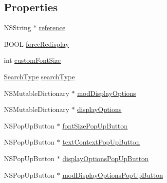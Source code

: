 \subsection*{Properties}
\begin{DoxyCompactItemize}
\item 
N\-S\-String $\ast$ \hyperlink{interface_module_commons_view_controller_a934a327293856e28b3dde0cab70e273c}{reference}
\item 
B\-O\-O\-L \hyperlink{interface_module_commons_view_controller_a0832b42c73bc41b106a06da9c8162868}{force\-Redisplay}
\item 
int \hyperlink{interface_module_commons_view_controller_a44abae3fa6c5495e330b4268a5cc5630}{custom\-Font\-Size}
\item 
\hyperlink{_indexer_8h_a15cc00b2ac3048d3b89959ced9ba0520}{Search\-Type} \hyperlink{interface_module_commons_view_controller_ac3a1fa49924063258d425f116eb8b687}{search\-Type}
\item 
N\-S\-Mutable\-Dictionary $\ast$ \hyperlink{interface_module_commons_view_controller_a4ea5fa9638ec886d8fe4f80b18098d32}{mod\-Display\-Options}
\item 
N\-S\-Mutable\-Dictionary $\ast$ \hyperlink{interface_module_commons_view_controller_a1eafa212969626703d079ad5e8eab56e}{display\-Options}
\item 
N\-S\-Pop\-Up\-Button $\ast$ \hyperlink{interface_module_commons_view_controller_a6df18b71a6eff307961ae19c3412176f}{font\-Size\-Pop\-Up\-Button}
\item 
N\-S\-Pop\-Up\-Button $\ast$ \hyperlink{interface_module_commons_view_controller_a827f880f7c6658c57bfaf8c0a085e38f}{text\-Context\-Pop\-Up\-Button}
\item 
N\-S\-Pop\-Up\-Button $\ast$ \hyperlink{interface_module_commons_view_controller_aa2cb9f72878d662625369eb79e6fc9f3}{display\-Options\-Pop\-Up\-Button}
\item 
N\-S\-Pop\-Up\-Button $\ast$ \hyperlink{interface_module_commons_view_controller_aabb36a359765e2f150e44ff2765bc420}{mod\-Display\-Options\-Pop\-Up\-Button}
\end{DoxyCompactItemize}


